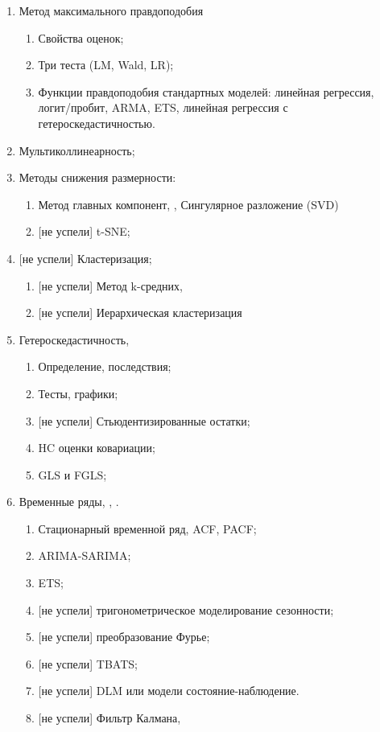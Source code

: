 \documentclass[12pt]{article}
\begin{document}
\begin{enumerate}
 \item Метод максимального правдоподобия

 \begin{enumerate}
 \item Свойства оценок;
 \item Три теста (LM, Wald, LR);
 \item Функции правдоподобия стандартных моделей: линейная регрессия, логит/пробит, ARMA, ETS,
 линейная регрессия с гетероскедастичностью.
 \end{enumerate}

 \item Мультиколлинеарность;

 \item Методы снижения размерности:
 \begin{enumerate}
   \item Метод главных компонент, \cite{decrouez2016sm}, Сингулярное разложение (SVD)
   \item {[не успели]} t-SNE;
 \end{enumerate}


 \item {[не успели]} Кластеризация;
 \begin{enumerate}
   \item {[не успели]} Метод k-средних, \cite{decrouez2016sm}
   \item {[не успели]} Иерархическая кластеризация
 \end{enumerate}


 \item Гетероскедастичность,  \cite{schmidheiny2016guides}
 \begin{enumerate}
 \item Определение, последствия;
 \item Тесты, графики;
 \item {[не успели]} Стьюдентизированные остатки;
 \item HC оценки ковариации;
 \item GLS и FGLS;
 \end{enumerate}

 \item Временные ряды, \cite{hyndman2014forecasting}, \cite{van2002time}.

 \begin{enumerate}
 \item Стационарный временной ряд, ACF, PACF;
 \item ARIMA-SARIMA;
 \item ETS;
 \item {[не успели]} тригонометрическое моделирование сезонности; \cite{pollock2010lectures}
 \item {[не успели]} преобразование Фурье; \cite{3blue1brown2017fourier}
 \item {[не успели]} TBATS;
 \item {[не успели]} DLM или модели состояние-наблюдение.
 \item {[не успели]} Фильтр Калмана, \cite{decrouez2016sm}
 \end{enumerate}



\end{enumerate}
\end{document}

